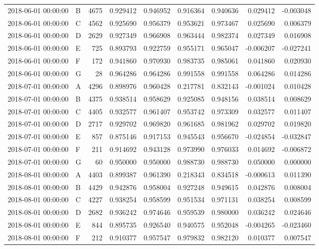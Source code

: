 \begin{tabular}{llrrrrrrr}
2018-06-01 00:00:00 & B & 4675 & 0.929412 & 0.946952 & 0.916364 & 0.940636 & 0.029412 & -0.003048 \\
2018-06-01 00:00:00 & C & 4562 & 0.925690 & 0.956379 & 0.953621 & 0.973467 & 0.025690 & 0.006379 \\
2018-06-01 00:00:00 & D & 2629 & 0.927349 & 0.966908 & 0.963444 & 0.982374 & 0.027349 & 0.016908 \\
2018-06-01 00:00:00 & E & 725 & 0.893793 & 0.922759 & 0.955171 & 0.965047 & -0.006207 & -0.027241 \\
2018-06-01 00:00:00 & F & 172 & 0.941860 & 0.970930 & 0.983735 & 0.985061 & 0.041860 & 0.020930 \\
2018-06-01 00:00:00 & G & 28 & 0.964286 & 0.964286 & 0.991558 & 0.991558 & 0.064286 & 0.014286 \\
2018-07-01 00:00:00 & A & 4296 & 0.898976 & 0.960428 & 0.217781 & 0.832143 & -0.001024 & 0.010428 \\
2018-07-01 00:00:00 & B & 4375 & 0.938514 & 0.958629 & 0.925085 & 0.948156 & 0.038514 & 0.008629 \\
2018-07-01 00:00:00 & C & 4405 & 0.932577 & 0.961407 & 0.953742 & 0.973309 & 0.032577 & 0.011407 \\
2018-07-01 00:00:00 & D & 2717 & 0.929702 & 0.969820 & 0.961685 & 0.981962 & 0.029702 & 0.019820 \\
2018-07-01 00:00:00 & E & 857 & 0.875146 & 0.917153 & 0.945543 & 0.956670 & -0.024854 & -0.032847 \\
2018-07-01 00:00:00 & F & 211 & 0.914692 & 0.943128 & 0.973990 & 0.976033 & 0.014692 & -0.006872 \\
2018-07-01 00:00:00 & G & 60 & 0.950000 & 0.950000 & 0.988730 & 0.988730 & 0.050000 & 0.000000 \\
2018-08-01 00:00:00 & A & 4403 & 0.899387 & 0.961390 & 0.218343 & 0.834518 & -0.000613 & 0.011390 \\
2018-08-01 00:00:00 & B & 4429 & 0.942876 & 0.958004 & 0.927248 & 0.949615 & 0.042876 & 0.008004 \\
2018-08-01 00:00:00 & C & 4227 & 0.938254 & 0.958599 & 0.951534 & 0.971131 & 0.038254 & 0.008599 \\
2018-08-01 00:00:00 & D & 2682 & 0.936242 & 0.974646 & 0.959539 & 0.980000 & 0.036242 & 0.024646 \\
2018-08-01 00:00:00 & E & 844 & 0.895735 & 0.926540 & 0.940575 & 0.952048 & -0.004265 & -0.023460 \\
2018-08-01 00:00:00 & F & 212 & 0.910377 & 0.957547 & 0.979832 & 0.982120 & 0.010377 & 0.007547 \\

\end{tabular}
